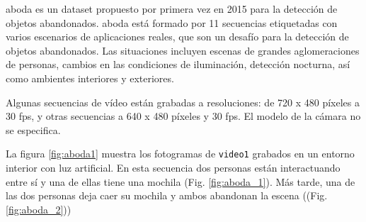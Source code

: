 \gls{aboda} \cite{aboda-dataset} es un dataset propuesto por primera vez en 2015 para la detección de objetos abandonados. \gls{aboda} está formado por 11 secuencias etiquetadas con varios escenarios de aplicaciones reales, que son un desafío para la detección de objetos abandonados. Las situaciones incluyen escenas de grandes aglomeraciones de personas, cambios en las condiciones de iluminación, detección nocturna, así como ambientes interiores y exteriores.

Algunas secuencias de vídeo están grabadas a resoluciones: de 720 x 480 píxeles a 30 \gls{fps}, y otras secuencias a 640 x 480 píxeles y 30 \gls{fps}. El modelo de la cámara no se especifica.

La figura \ref{fig:aboda1} muestra los fotogramas de \texttt{video1} grabados en un entorno interior con luz artificial. En esta secuencia dos personas están interactuando entre sí y una de ellas tiene una mochila (Fig. \ref{fig:aboda_1}). Más tarde, una de las dos personas deja caer su mochila y ambos abandonan la escena ((Fig. \ref{fig:aboda_2}))

